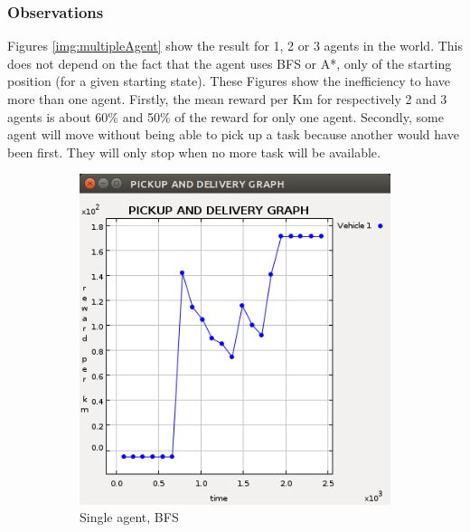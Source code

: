 \documentclass[11pt]{article}
\begin{document}
\subsubsection{Observations}
Figures \ref{img:multipleAgent} show the result for 1, 2 or 3 agents in the world. This does not depend on the fact that the agent uses BFS or A*, only of the starting position (for a given starting state).
These Figures show the inefficiency to have more than one agent. Firstly, the mean reward per Km for respectively 2 and 3 agents is about 60\% and 50\% of the reward for only one agent. Secondly, some agent will move without being able to pick up a task because another would have been first. They will only stop when no more task will be available.
\begin{figure}
  \begin{subfigure}[b]{0.3\textwidth}
    \includegraphics[width=\textwidth]{1agent.png}
    \caption{Single agent, BFS}
    \label{img:1agent}
  \end{subfigure}
  \begin{subfigure}[b]{0.3\textwidth}

\end{subfigure}
\end{figure}
\end{document}
